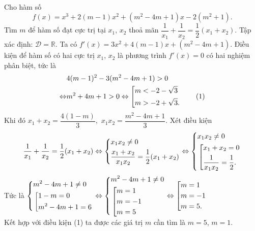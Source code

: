 \begin{bt}%
	Cho hàm số $$f(x) = x^3 + 2(m - 1)x^2 + (m^2 - 4m + 1)x - 2(m^2 + 1).$$
	Tìm $m$ để hàm số đạt cực trị tại $x_1$, $x_2$ thoả mãn $\dfrac{1}{x_1} + \dfrac{1}{x_2} = \dfrac{1}{2}(x_1 + x_2)$.
	\loigiai
	{
		Tập xác định: $\mathscr{D}=\mathbb{R}$. Ta có $f'(x) = 3x^2 + 4(m - 1)x + (m^2 - 4m + 1)$.
		Điều kiện để hàm số có hai cực trị $x_1$, $x_2$ là phương trình $f'(x)=0$ có hai nghiệm phân biệt, tức là
		{\allowdisplaybreaks
			\begin{align*}
			&4(m - 1)^2 - 3(m^2 - 4m + 1) > 0 \\
			\Leftrightarrow& m^2 + 4m + 1 > 0 \Leftrightarrow \left[\begin{aligned}&m <  - 2 - \sqrt 3 \\&m >  - 2 + \sqrt 3.\end{aligned}\right.\tag{1}
			\end{align*}}
		Khi đó $x_1 + x_2 = \dfrac{4(1 - m)}{3},\,\,x_1x_2 = \dfrac{m^2 - 4m + 1}{3}$.
		Xét điều kiện
		$$\dfrac{1}{x_1} + \dfrac{1}{x_2} = \dfrac{1}{2}(x_1 + x_2)
		\Leftrightarrow \left\{\begin{aligned}&x_1x_2 \ne 0\\&\dfrac{x_1 + x_2}{x_1x_2} = \dfrac{1}{2}(x_1 + x_2)\end{aligned}\right.
		\Leftrightarrow \left\{\begin{aligned}&x_1x_2 \ne 0\\&\left[\begin{aligned}&x_1 + x_2 = 0\\&\dfrac{1}{x_1x_2} = \dfrac{1}{2}.\end{aligned}\right.\end{aligned}\right.
		$$
		Tức là $\left\{\begin{aligned}&m^2 - 4m + 1 \ne 0\\&\left[\begin{aligned}&1 - m = 0\\&m^2 - 4m + 1 = 6\end{aligned}\right.\end{aligned}\right.
		\Leftrightarrow \left\{\begin{aligned}&m^2 - 4m + 1 \ne 0\\&\left[\begin{aligned}&m = 1\\&m =  - 1\\&m = 5\end{aligned}\right.\end{aligned}\right.
		\Leftrightarrow \left[\begin{aligned}&m = 1\\&m =  - 1\\&m = 5.\end{aligned}\right.$\\
		Kết hợp với điều kiện (1) ta được các giá trị $m$ cần tìm là $m=5$, $m=1$.
	}
\end{bt}


